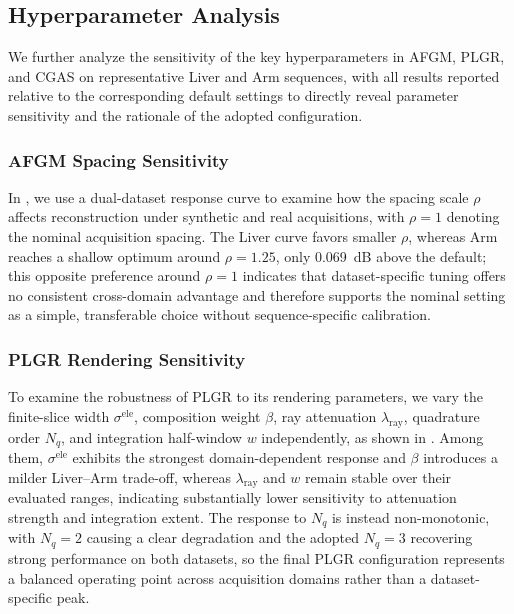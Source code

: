 



\vspace{-5mm}
\subsection{Hyperparameter Analysis}

\label{sec:results:hyperparameters}

We further analyze the sensitivity of the key hyperparameters in AFGM, PLGR,
and CGAS on representative Liver and Arm sequences, with all results reported
relative to the corresponding default settings to directly reveal parameter
sensitivity and the rationale of the adopted configuration.

\subsubsection{AFGM Spacing Sensitivity}

In , we use a dual-dataset response curve to examine
how the spacing scale $\rho$ affects reconstruction under synthetic and real
acquisitions, with $\rho=1$ denoting the nominal acquisition spacing. The
Liver curve favors smaller $\rho$, whereas Arm reaches a shallow optimum
around $\rho=1.25$, only 0.069~dB above the default; this opposite preference
around $\rho=1$ indicates that dataset-specific tuning offers no consistent
cross-domain advantage and therefore supports the nominal setting as a simple,
transferable choice without sequence-specific calibration.

\subsubsection{PLGR Rendering Sensitivity}

To examine the robustness of PLGR to its rendering parameters, we vary the
finite-slice width $\sigma^{\mathrm{ele}}$, composition weight $\beta$, ray
attenuation $\lambda_{\mathrm{ray}}$, quadrature order $N_q$, and integration
half-window $w$ independently, as shown in
. Among them, $\sigma^{\mathrm{ele}}$ exhibits the
strongest domain-dependent response and $\beta$ introduces a milder Liver--Arm
trade-off, whereas $\lambda_{\mathrm{ray}}$ and $w$ remain stable over their
evaluated ranges, indicating substantially lower sensitivity to attenuation
strength and integration extent. The response to $N_q$ is instead
non-monotonic, with $N_q=2$ causing a clear degradation and the adopted
$N_q=3$ recovering strong performance on both datasets, so the final PLGR
configuration represents a balanced operating point across acquisition
domains rather than a dataset-specific peak.

